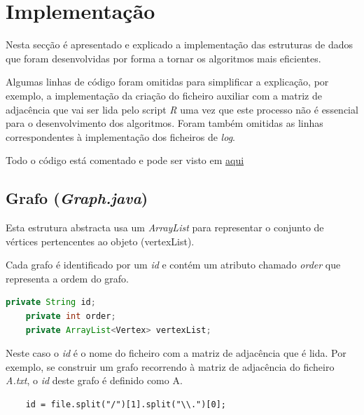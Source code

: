 \documentclass[a4paper,12pt]{report}
\begin{document}

%

\chapter{Implementação}

Nesta secção é apresentado e explicado a implementação das estruturas de dados que foram desenvolvidas por forma a tornar os algoritmos mais eficientes.

Algumas linhas de código foram omitidas para simplificar a explicação, por exemplo, a implementação da criação do ficheiro auxiliar com a matriz de adjacência que vai ser lida pelo script \textit{R} uma vez que este processo não é essencial para o desenvolvimento dos algoritmos.
Foram também omitidas as linhas correspondentes à implementação dos ficheiros de \textit{log}.

Todo o código está comentado e pode ser visto em  \href{https://github.com/cfchenr/sma}{aqui}

\section{Grafo (\textit{Graph.java})}

Esta estrutura abstracta usa um \textit{ArrayList} para representar o conjunto de vértices pertencentes ao objeto (vertexList).

Cada grafo é identificado por um \textit{id} e contém um atributo chamado \textit{order} que representa a ordem do grafo.

\begin{lstlisting}[language=Java]
    private String id;
    private int order;
    private ArrayList<Vertex> vertexList;
\end{lstlisting}

Neste caso o \textit{id} é o nome do ficheiro com a matriz de adjacência que é lida. Por exemplo, se construir um grafo recorrendo à matriz de adjacência do ficheiro \textit{A.txt}, o \textit{id} deste grafo é definido como A.

\begin{lstlisting}
    id = file.split("/")[1].split("\\.")[0];
\end{lstlisting}
\end{document}
